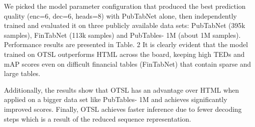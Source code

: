 \documentclass[11pt,a4paper]{article}
\begin{document}
We picked the model parameter configuration that produced the best prediction quality (enc=6, dec=6, heads=8) with PubTabNet alone, then independently trained and evaluated it on three publicly available data sets: PubTabNet (395k samples), FinTabNet (113k samples) and PubTables- 1M (about 1M samples). Performance results are presented in Table. 2 It is clearly evident that the model trained on OTSL outperforms HTML across the board, keeping high TEDs and mAP scores even on difficult financial tables (FinTabNet) that contain sparse and large tables.

Additionally, the results show that OTSL has an advantage over HTML when applied on a bigger data set like PubTables- 1M and achieves significantly improved scores. Finally, OTSL achieves faster inference due to fewer decoding steps which is a result of the reduced sequence representation.
\end{document}
